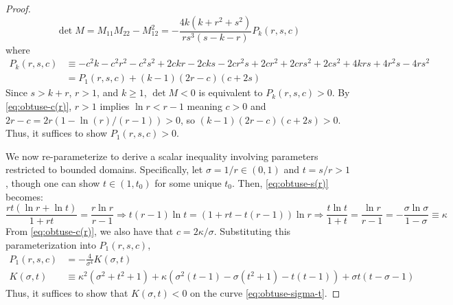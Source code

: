 \documentclass[11pt]{article}
\begin{document}
\begin{proof}
\begin{equation}
    \det M =M_{11}M_{22}-M_{12}^2 =-\frac{4k(k+r^2+s^2)}{rs^3(s-k-r)}P_{k}(r,s,c)
\end{equation}
where 
\begin{equation}
\begin{aligned}
    P_k(r,s,c)&\equiv-c^2 k-c^2 r^2-c^2 s^2+2ckr-2cks-2cr^2s+2cr^2+2crs^2+2cs^2+4krs+4r^2 s-4rs^2\\
    &=P_1(r,s,c)+(k-1)(2r-c)(c+2s)
\end{aligned}
\end{equation}
Since $s>k+r$, $r>1$, and $k\geq 1$, $\det M <0$ is equivalent to $P_k(r,s,c)>0$. By \eqref{eq:obtuse-c(r)}, $r>1$ implies $\ln r<r-1$ meaning $c>0$ and $2r-c=2r(1-\ln (r)/(r-1))>0$, so $(k-1)(2r-c)(c+2s)>0$. Thus, it suffices to show $P_1(r,s,c)>0$. 

We now re-parameterize to derive a scalar inequality involving parameters restricted to bounded domains. Specifically, let $\sigma=1/r\in (0,1)$ and $t=s/r>1$, though one can show $t\in (1,t_0)$ for some unique $t_0$. Then, \eqref{eq:obtuse-s(r)} becomes:
\begin{equation}\label{eq:obtuse-sigma-t}
    \frac{rt(\ln r+\ln t)}{1+rt}=\frac{r\ln r }{r-1}\Rightarrow t(r-1)\ln t =(1+rt-t(r-1))\ln r \Rightarrow  \frac{t\ln t }{1+t}=\frac{\ln r }{r-1}=-\frac{\sigma \ln \sigma}{1-\sigma }\equiv \kappa
\end{equation}
From \eqref{eq:obtuse-c(r)}, we also have that $c=2\kappa/\sigma$. Substituting this parameterization into $P_1(r,s,c)$, 
\begin{equation}\label{eq:obtuse-K}
\begin{aligned}
    P_1(r,s,c)&=-\frac 4{\sigma^4 }K(\sigma,t)\\
    K(\sigma,t)&\equiv \kappa^2(\sigma^2+t^2+1)+\kappa(\sigma^2(t-1)-\sigma(t^2+1)-t(t-1))+\sigma t(t-\sigma-1)
\end{aligned}
\end{equation}
Thus, it suffices to show that $K(\sigma,t)<0$ on the curve \eqref{eq:obtuse-sigma-t}. 


\end{proof}
\end{document}
